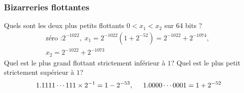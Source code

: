 \begin{frame}
  \frametitle{Bizarreries flottantes}
Quels sont les deux plus petits flottants $0<x_1<x_2$ sur 64 bits ?
\begin{multline*}
  \text{zéro :} 2^{-1022},\; x_1 = 2^{-1022}(1 + 2^{-52}) = 2^{-1022} + 2^{-1074},\;\\ x_2 = 2^{-1022} + 2^{-1073}  
\end{multline*}
Quel est le plus grand flottant strictement inférieur à $1$? Quel est le plus petit strictement supérieur à $1$?
\begin{displaymath}
  1.1111\cdots 111 \times 2^{-1} = 1 -2^{-53},\hspace{0.5cm} 1.0000 \cdots 0001 = 1+2^{-52}
\end{displaymath}

\end{frame}


